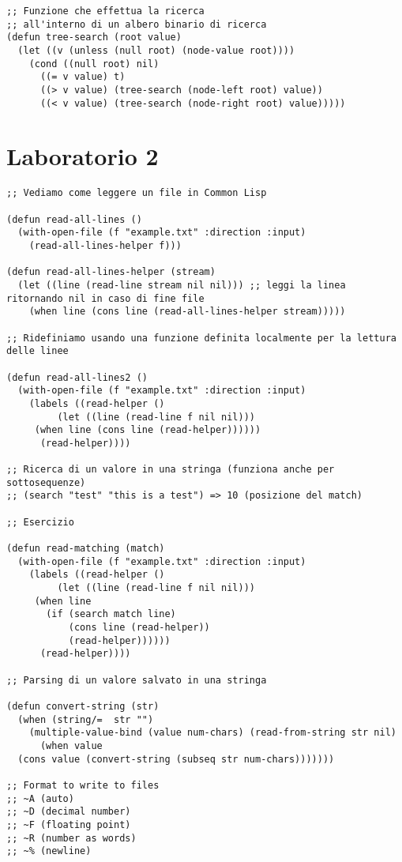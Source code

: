 \documentclass[a4paper,12pt, oneside]{book}
\begin{document}
\begin{verbatim}
;; Funzione che effettua la ricerca 
;; all'interno di un albero binario di ricerca
(defun tree-search (root value)
  (let ((v (unless (null root) (node-value root))))
    (cond ((null root) nil)
      ((= v value) t)
      ((> v value) (tree-search (node-left root) value))
      ((< v value) (tree-search (node-right root) value)))))

\end{verbatim}
\section{Laboratorio 2}
\begin{verbatim}
;; Vediamo come leggere un file in Common Lisp

(defun read-all-lines ()
  (with-open-file (f "example.txt" :direction :input)
    (read-all-lines-helper f)))

(defun read-all-lines-helper (stream)
  (let ((line (read-line stream nil nil))) ;; leggi la linea ritornando nil in caso di fine file
    (when line (cons line (read-all-lines-helper stream)))))

;; Ridefiniamo usando una funzione definita localmente per la lettura delle linee

(defun read-all-lines2 ()
  (with-open-file (f "example.txt" :direction :input)
    (labels ((read-helper ()
         (let ((line (read-line f nil nil)))
     (when line (cons line (read-helper))))))
      (read-helper))))

;; Ricerca di un valore in una stringa (funziona anche per sottosequenze)
;; (search "test" "this is a test") => 10 (posizione del match)

;; Esercizio

(defun read-matching (match)
  (with-open-file (f "example.txt" :direction :input)
    (labels ((read-helper ()
         (let ((line (read-line f nil nil)))
     (when line
       (if (search match line)
           (cons line (read-helper))
           (read-helper))))))
      (read-helper))))

;; Parsing di un valore salvato in una stringa

(defun convert-string (str)
  (when (string/=  str "")
    (multiple-value-bind (value num-chars) (read-from-string str nil)
      (when value
  (cons value (convert-string (subseq str num-chars)))))))

;; Format to write to files
;; ~A (auto)
;; ~D (decimal number)
;; ~F (floating point)
;; ~R (number as words)
;; ~% (newline)


\end{verbatim}
\end{document}
